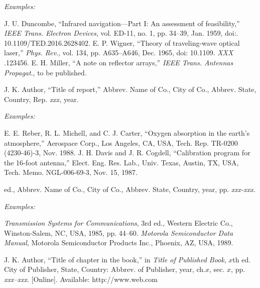 \documentclass[journal,twoside,web]{ieeecolor}
\begin{document}
{\it Examples:}{\vadjust{\vspace*{-2.5em}}}

\begin{thebibliography}{00}
 J. U. Duncombe, ``Infrared navigation---Part I: An assessment of feasibility,'' {\it IEEE Trans. Electron Devices}, vol. ED-11, no. 1, pp. 34--39, Jan. 1959, doi:.  {10.1109/TED.2016.2628402}.
 E. P. Wigner, ``Theory of traveling-wave optical laser,''
{\it Phys. Rev}., vol. 134, pp. A635--A646, Dec. 1965, doi:  {10.1109.} {{\it XXX}} {.123456}.
 E. H. Miller, ``A note on reflector arrays,'' {\it IEEE Trans. Antennas Propagat}., to be published.
\end{thebibliography}


\noindent J. K. Author, ``Title of report,'' Abbrev. Name of Co., City of Co., Abbrev.
State, Country, Rep. {\it xxx}, year.

{\it Examples:}
\begin{thebibliography}{00}
 E. E. Reber, R. L. Michell, and C. J. Carter, ``Oxygen absorption in the earth's atmosphere,'' Aerospace Corp., Los Angeles, CA, USA, Tech. Rep. TR-0200 (4230-46)-3, Nov. 1988.
 J. H. Davis and J. R. Cogdell, ``Calibration program for the 16-foot antenna,'' Elect. Eng. Res. Lab., Univ. Texas, Austin, TX, USA, Tech. Memo. NGL-006-69-3, Nov. 15, 1987.
\end{thebibliography}


 ed., Abbrev. Name of Co., City of Co., Abbrev. State, Country, year, pp.
{\it xxx-xxx.}

{\it Examples:}{\vadjust{\vspace*{-2.5em}}}

\begin{thebibliography}{00}
 {\it Transmission Systems for Communications}, 3rd ed., Western Electric Co., Winston-Salem, NC, USA, 1985, pp. 44--60.
 {\it Motorola Semiconductor Data Manual}, Motorola Semiconductor Products Inc., Phoenix, AZ, USA, 1989.
\end{thebibliography}


\noindent J. K. Author, ``Title of chapter in the book,'' in {\it Title of Published Book}, $x$th ed. City of
Publisher, State, Country: Abbrev. of Publisher, year, ch.$x$, sec. $x$, pp.
{\it xxx--xxx}. [Online]. Available:  {http://www.web.com}
\end{document}
